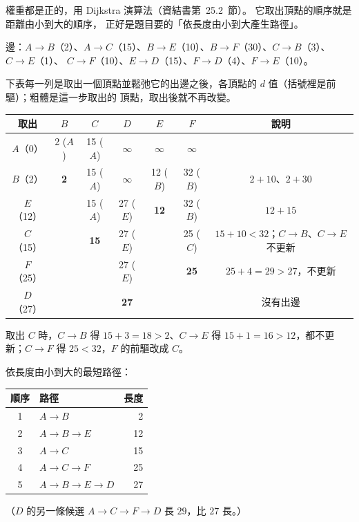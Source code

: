 \begin{pastsoln}
權重都是正的，用 Dijkstra 演算法（資結書第~25.2~節）。 它取出頂點的順序就是距離由小到大的順序，
正好是題目要的「依長度由小到大產生路徑」。

邊：$A \to B$（2）、$A \to C$（15）、$B \to E$（10）、$B \to F$（30）、$C \to B$（3）、$C \to E$（1）、
$C \to F$（10）、$E \to D$（15）、$F \to D$（4）、$F \to E$（10）。

下表每一列是取出一個頂點並鬆弛它的出邊之後，各頂點的 $d$ 值（括號裡是前驅）；粗體是這一步取出的
頂點，取出後就不再改變。
\begin{center}
\small
\begin{tabular}{ccccccc}
\toprule
取出 & $B$ & $C$ & $D$ & $E$ & $F$ & 說明 \\
\midrule
$A$（0） & 2 ($A$) & 15 ($A$) & $\infty$ & $\infty$ & $\infty$ & \\
$B$（2） & \textbf{2} & 15 ($A$) & $\infty$ & 12 ($B$) & 32 ($B$) & $2 + 10$、$2 + 30$ \\
$E$（12） & & 15 ($A$) & 27 ($E$) & \textbf{12} & 32 ($B$) & $12 + 15$ \\
$C$（15） & & \textbf{15} & 27 ($E$) & & 25 ($C$) & $15 + 10 < 32$；$C \to B$、$C \to E$ 不更新 \\
$F$（25） & & & 27 ($E$) & & \textbf{25} & $25 + 4 = 29 > 27$，不更新 \\
$D$（27） & & & \textbf{27} & & & 沒有出邊 \\
\bottomrule
\end{tabular}
\end{center}
取出 $C$ 時，$C \to B$ 得 $15 + 3 = 18 > 2$、$C \to E$ 得 $15 + 1 = 16 > 12$，都不更新；$C \to F$ 得
$25 < 32$，$F$ 的前驅改成 $C$。

依長度由小到大的最短路徑：
\begin{center}
\begin{tabular}{clr}
\toprule
順序 & 路徑 & 長度 \\
\midrule
1 & $A \to B$ & 2 \\
2 & $A \to B \to E$ & 12 \\
3 & $A \to C$ & 15 \\
4 & $A \to C \to F$ & 25 \\
5 & $A \to B \to E \to D$ & 27 \\
\bottomrule
\end{tabular}
\end{center}
（$D$ 的另一條候選 $A \to C \to F \to D$ 長 $29$，比 $27$ 長。）
\end{pastsoln}
